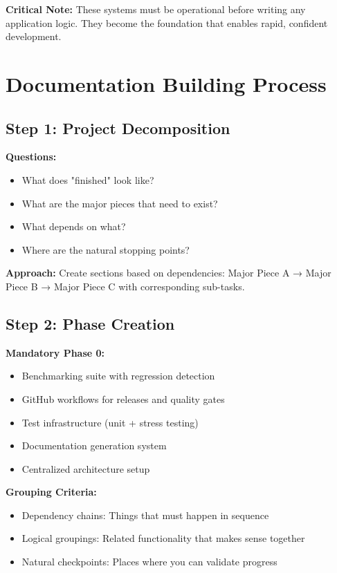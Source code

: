 \documentclass{article}
\begin{document}
\textbf{Critical Note:} These systems must be operational before writing any application logic. They become the foundation that enables rapid, confident development.

\section{Documentation Building Process}

\subsection{Step 1: Project Decomposition}
\textbf{Questions:}
\begin{itemize}[noitemsep]
\item What does "finished" look like?
\item What are the major pieces that need to exist?
\item What depends on what?
\item Where are the natural stopping points?
\end{itemize}

\textbf{Approach:} Create sections based on dependencies: Major Piece A → Major Piece B → Major Piece C with corresponding sub-tasks.

\subsection{Step 2: Phase Creation}
\textbf{Mandatory Phase 0:}
\begin{itemize}[noitemsep]
\item Benchmarking suite with regression detection
\item GitHub workflows for releases and quality gates
\item Test infrastructure (unit + stress testing)
\item Documentation generation system
\item Centralized architecture setup
\end{itemize}

\textbf{Grouping Criteria:}
\begin{itemize}[noitemsep]
\item Dependency chains: Things that must happen in sequence
\item Logical groupings: Related functionality that makes sense together
\item Natural checkpoints: Places where you can validate progress
\end{itemize}
\end{document}
